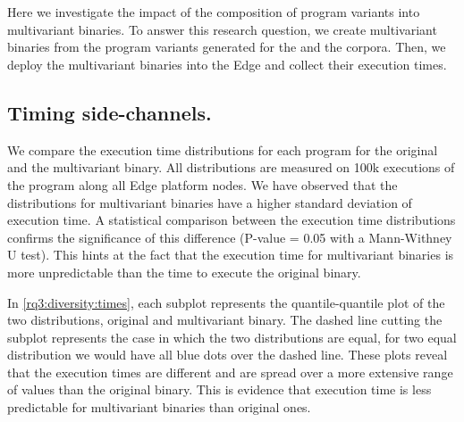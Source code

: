 \section{\rqthree}
\label{results:rq3}

Here we investigate the impact of the composition of program variants into multivariant binaries.
To answer this research question, we create multivariant binaries from the program variants generated for the \corpussodium and the \corpusqrcode corpora. Then, we deploy the multivariant binaries into the Edge and collect their execution times. 

\subsection*{Timing side-channels.}

We compare the execution time distributions for each program for the original and the multivariant binary. All distributions are measured on 100k executions of the program along all Edge platform nodes.
We have observed that the distributions for multivariant binaries have a higher standard deviation of execution time.
A statistical comparison between the execution time distributions confirms the significance of this difference (P-value = 0.05 with a  Mann-Withney U test). This hints at the fact that the execution time for multivariant binaries is more unpredictable than the time to execute the original binary. 


In \autoref{rq3:diversity:times}, each subplot represents the quantile-quantile plot of the two distributions, original and multivariant binary. The dashed line cutting the subplot represents the case in which the two distributions are equal, \ie for two equal distribution we would have all blue dots over the dashed line. These plots reveal that the execution times are different and are spread over a more extensive range of values than the original binary.
This is evidence that execution time is less predictable for multivariant binaries than original ones.

